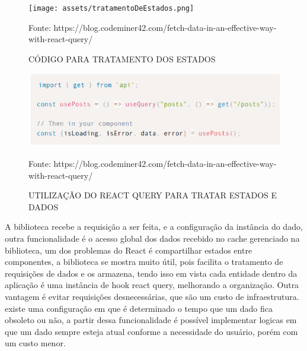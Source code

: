 \documentclass{ufersa}
\begin{document}
\begin{figure}[!h]
\centering 
\caption{CÓDIGO PARA TRATAMENTO DOS ESTADOS}
\texttt{[image: assets/tratamentoDeEstados.png]} 
{\footnotesize 

Fonte: https://blog.codeminer42.com/fetch-data-in-an-effective-way-with-react-query/}
\label{fig:tratamentoDeEstados}
\end{figure}

\begin{figure}[!h]
\centering 
\caption{UTILIZAÇÃO DO REACT QUERY PARA TRATAR ESTADOS E DADOS}
\includegraphics[width=15cm]{assets/estadosComReactQuery.png} 
{\footnotesize 

Fonte: https://blog.codeminer42.com/fetch-data-in-an-effective-way-with-react-query/}
\label{fig:estadosComReactQuery}
\end{figure}

A biblioteca recebe a requisição a ser feita, e a configuração da instância do dado, outra funcionalidade é o acesso global dos dados recebido no cache gerenciado na biblioteca, um dos problemas do React é compartilhar estados entre componentes, a biblioteca se mostra muito útil, pois facilita o tratamento de requisições de dados e os armazena, tendo isso em vista cada entidade dentro da aplicação é uma instância de hook react query, melhorando a organização. Outra vantagem é evitar requisições desnecessárias, que são um custo de infraestrutura. existe uma configuração em que é determinado o tempo que um dado fica obsoleto ou não, a partir dessa funcionalidade é possível implementar logicas em que um dado sempre esteja atual conforme a necessidade do usuário, porém com um custo menor.
\end{document}
